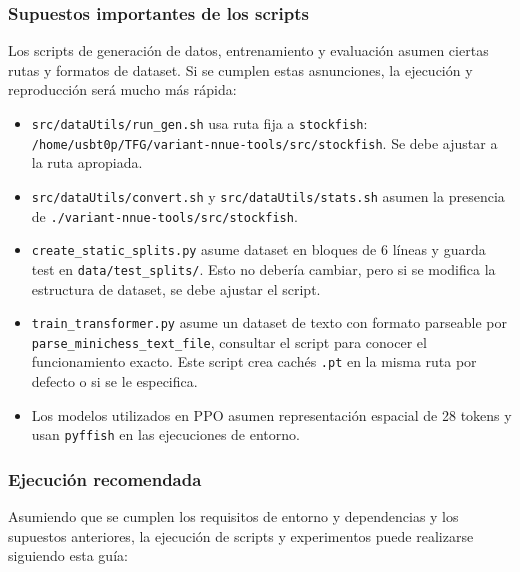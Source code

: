 \documentclass[12pt, a4paper]{article}
\begin{document}
\subsubsection*{Supuestos importantes de los scripts}
Los scripts de generación de datos, entrenamiento y evaluación asumen ciertas rutas y formatos de dataset. Si se cumplen estas asnunciones, la ejecución y reproducción será mucho más rápida:
\begin{itemize}
    \item \texttt{src/dataUtils/run\_gen.sh} usa ruta fija a \texttt{stockfish}: \\
    \texttt{/home/usbt0p/TFG/variant-nnue-tools/src/stockfish}. Se debe ajustar a la ruta apropiada.
    \item \texttt{src/dataUtils/convert.sh} y \texttt{src/dataUtils/stats.sh} asumen la presencia \\ de \texttt{./variant-nnue-tools/src/stockfish}.
    \item \texttt{create\_static\_splits.py} asume dataset en bloques de 6 líneas y guarda test en \texttt{data/test\_splits/}. Esto no debería cambiar, pero si se modifica la estructura de dataset, se debe ajustar el script.
    \item \texttt{train\_transformer.py} asume un dataset de texto con formato parseable por \\ \texttt{parse\_minichess\_text\_file}, consultar el script para conocer el funcionamiento exacto. Este script crea cachés \texttt{.pt} en la misma ruta por defecto o si se le especifica.
    \item Los modelos utilizados en PPO asumen representación espacial de 28 tokens y usan \texttt{pyffish} en las ejecuciones de entorno.
\end{itemize}

\subsubsection*{Ejecución recomendada}
Asumiendo que se cumplen los requisitos de entorno y dependencias y los supuestos anteriores, la ejecución de scripts y experimentos puede realizarse siguiendo esta guía:
\end{document}
